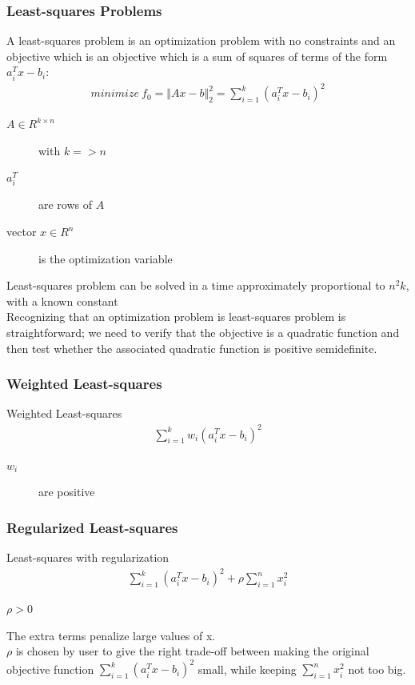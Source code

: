 \documentclass{beamer}
\begin{document}

\begin{frame}
\frametitle{Least-squares Problems}
A least-squares problem is an optimization problem with no constraints and an objective which is an objective which is a sum of squares of terms of the form $a_{i}^{T}x - b_{i}$:
\begin{align}
minimize~f_{0}=\Vert Ax - b \Vert_{2}^{2} = \sum^{k}_{i=1}(a^{T}_{i}x-b_{i})^{2}
\end{align}
\begin{description}
\item [$A \in R ^{k \times n}$] with $k => n$
\item [$a_{i}^{T}$] are rows of $A$
\item [vector $x \in R^{n}$] is the optimization variable
\end{description}
Least-squares problem can be solved in a time approximately proportional to $n^{2}k$, with a known constant \\
Recognizing that an optimization problem is least-squares problem is straightforward; we need to verify that the objective is a quadratic function and then test whether the associated quadratic function is positive semidefinite.

\end{frame}


\begin{frame}
\frametitle{Weighted Least-squares}
\begin{block}{Weighted Least-squares}
\begin{align}
\sum^{k}_{i=1}w_{i}(a_{i}^{T}x - b_{i})^{2}
\end{align}
\end{block}
\begin{description}
\item [$w_{i}$] are positive
\end{description}
\end{frame}


\begin{frame}
\frametitle{Regularized Least-squares}
\begin{block}{Least-squares with regularization}
\begin{align}
\label{eq:least_squares_problem}
\sum^{k}_{i=1}(a_{i}^{T}x - b_{i})^{2} + \rho \sum_{i=1}^{n}x_{i}^{2}
\end{align}
\end{block}
\begin{description}
\item [$\rho > 0$]
\end{description}
The extra terms penalize large values of x.\\
$\rho$ is chosen by user to give the right trade-off between making the original objective function $\sum^{k}_{i=1}(a_{i}^{T}x - b_{i})^{2}$ small, while keeping $\sum_{i=1}^{n}x^{2}_{i}$ not too big.
\end{frame}
\end{document}
